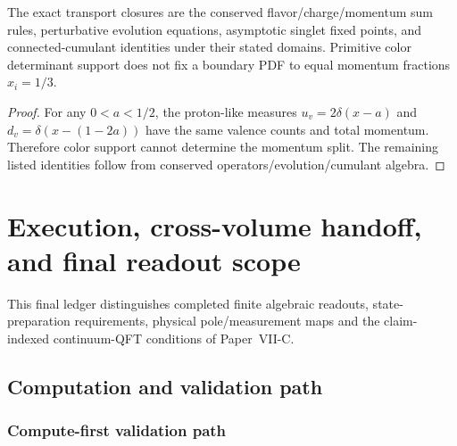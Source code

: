 \documentclass[12pt,a4paper]{article}
\begin{document}
\begin{corollary}
\label{p11:cor:transport-endpoint-closures}

The exact transport closures are the conserved flavor/charge/momentum sum rules, perturbative evolution equations, asymptotic singlet fixed points, and connected-cumulant identities under their stated domains.  Primitive color determinant support does not fix a boundary PDF to equal momentum fractions \(x_i=1/3\).

\end{corollary}
\begin{proof}

For any \(0<a<1/2\), the proton-like measures \(u_v=2\delta(x-a)\) and \(d_v=\delta(x-(1-2a))\) have the same valence counts and total momentum.  Therefore color support cannot determine the momentum split.  The remaining listed identities follow from conserved operators/evolution/cumulant algebra.
\end{proof}




\section{Execution, cross-volume handoff, and final readout scope}
\label{p11:sec:v237-b8}
This final ledger distinguishes completed finite algebraic readouts, state-preparation requirements, physical pole/measurement maps and the claim-indexed continuum-QFT conditions of Paper~VII-C.

\label{p11:part:computation-validation}


\subsection{Computation and validation path}
\label{p11:sec:minimal-upgrade-path}


\subsubsection{Compute-first validation path}
\label{p11:subsec:compute-first-validation-path}
\end{document}

